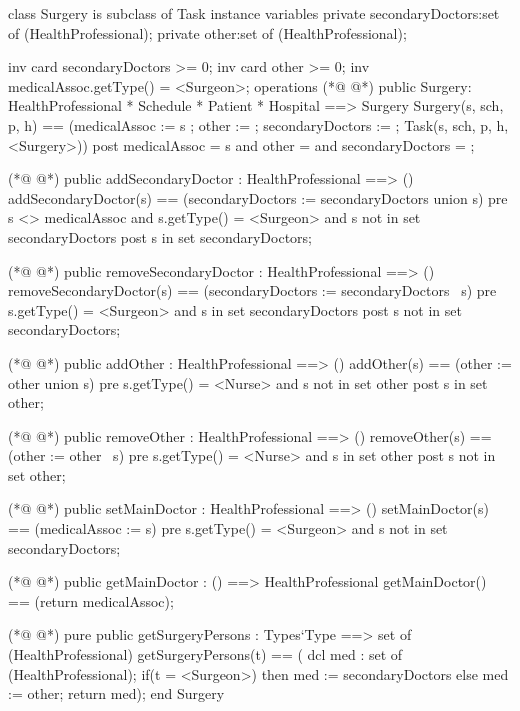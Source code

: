 \begin{vdmpp}[breaklines=true]
class Surgery is subclass of Task
instance variables
  private secondaryDoctors:set of (HealthProfessional);
  private other:set of (HealthProfessional);
  
  inv card secondaryDoctors >= 0;
  inv card other >= 0;
  inv medicalAssoc.getType() = <Surgeon>;
operations
(*@
\label{Surgery:10}
@*)
 public Surgery: HealthProfessional * Schedule * Patient * Hospital ==> Surgery
  Surgery(s, sch, p, h) == (medicalAssoc := s ; other := {}; secondaryDoctors := {}; Task(s, sch, p, h, <Surgery>))
 post medicalAssoc = s and other = {} and secondaryDoctors = {};
 
(*@
\label{addSecondaryDoctor:14}
@*)
 public addSecondaryDoctor : HealthProfessional ==> ()
  addSecondaryDoctor(s) == (secondaryDoctors := secondaryDoctors union {s})
 pre s <> medicalAssoc and s.getType() = <Surgeon> and  s not in set secondaryDoctors
 post s in set secondaryDoctors;
  
(*@
\label{removeSecondaryDoctor:19}
@*)
 public removeSecondaryDoctor : HealthProfessional ==> ()
  removeSecondaryDoctor(s) == (secondaryDoctors := secondaryDoctors \ {s})
 pre s.getType() = <Surgeon> and s in set secondaryDoctors
 post s not in set secondaryDoctors;
  
(*@
\label{addOther:24}
@*)
 public addOther : HealthProfessional ==> ()
  addOther(s) == (other := other union {s})
 pre s.getType() = <Nurse> and s not in set other
 post s in set other;
  
(*@
\label{removeOther:29}
@*)
 public removeOther : HealthProfessional ==> ()
  removeOther(s) == (other := other \ {s})
 pre s.getType() = <Nurse> and s in set other
 post s not in set other;
  
(*@
\label{setMainDoctor:34}
@*)
 public setMainDoctor : HealthProfessional ==> ()
  setMainDoctor(s) == (medicalAssoc := s)
 pre s.getType() = <Surgeon> and s not in set secondaryDoctors;
 
(*@
\label{getMainDoctor:38}
@*)
 public getMainDoctor : () ==> HealthProfessional
  getMainDoctor() == (return medicalAssoc);

(*@
\label{getSurgeryPersons:41}
@*)
 pure public getSurgeryPersons : Types`Type ==> set of (HealthProfessional)
  getSurgeryPersons(t) == (
               dcl med : set of (HealthProfessional);
               if(t = <Surgeon>)
                then med := secondaryDoctors
               else
                med := other;
               return med);
end Surgery
\end{vdmpp}
